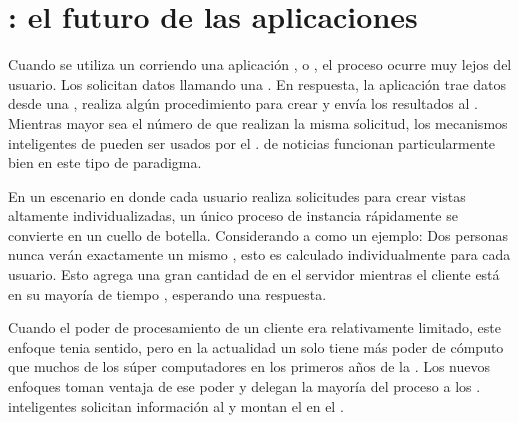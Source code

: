 
\section{\isomorphicAS \javaScriptNAME : el futuro de las aplicaciones \webINT}\label{cap:justificacion:section:web_app}

Cuando se utiliza un \backendAS corriendo una aplicación \javaNAME, \phpNAME o \railsNAME, el proceso ocurre muy lejos del usuario. Los \clientsAS solicitan datos llamando una \uriNAME. En respuesta, la aplicación trae datos desde una \dataBaseDB, realiza algún procedimiento para crear \htmlNAME y envía los resultados al \clientAS. Mientras mayor sea el número de \clientsAS que realizan la misma solicitud, los mecanismos inteligentes de \caching pueden ser usados por el \serverAS. \sitesINT de noticias funcionan particularmente bien en este tipo de paradigma.

En un escenario en donde cada usuario realiza solicitudes para crear vistas altamente individualizadas, un único proceso de instancia rápidamente se convierte en un cuello de botella. Considerando a \facebook como un ejemplo: Dos personas nunca verán exactamente un mismo \facebookwall, esto es calculado individualmente para cada usuario. Esto agrega una gran cantidad de \stress en el servidor mientras el cliente está en su mayoría de tiempo \idle, esperando una respuesta.

Cuando el poder de procesamiento de un cliente era relativamente limitado, este enfoque tenia sentido, pero en la actualidad un solo \smartphoneCPT tiene más poder de cómputo que muchos de los súper computadores en los primeros años de la \webINT. Los nuevos enfoques toman ventaja de ese poder y delegan la mayoría del proceso a los \clientsAS. \frontEndsAS inteligentes solicitan información al \serverAS y montan el \htmldomNAME en el \browserINT.

